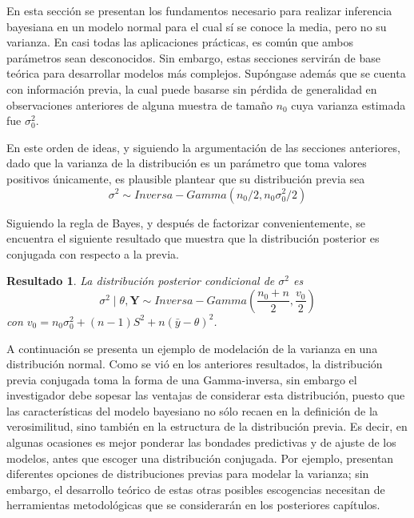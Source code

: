 \documentclass[
  10pt,
  spanish,
]{book}
\newtheorem{proposition}{Resultado}[chapter]
\theoremstyle{definition}
\theoremstyle{definition}
\theoremstyle{definition}
\theoremstyle{definition}
\theoremstyle{remark}
\begin{document}
En esta sección se presentan los fundamentos necesario para realizar inferencia bayesiana en un modelo normal para el cual sí se conoce la media, pero no su varianza. En casi todas las aplicaciones prácticas, es común que ambos parámetros sean desconocidos. Sin embargo, estas secciones servirán de base teórica para desarrollar modelos más complejos. Supóngase además que se cuenta con información previa, la cual puede basarse sin pérdida de generalidad en observaciones anteriores de alguna muestra de tamaño \(n_0\) cuya varianza estimada fue \(\sigma^2_0\).

En este orden de ideas, y siguiendo la argumentación de las secciones anteriores, dado que la varianza de la distribución es un parámetro que toma valores positivos únicamente, es plausible plantear que su distribución previa sea
\begin{equation*}
\sigma^2 \sim Inversa-Gamma(n_0/2, n_0\sigma^2_0/2)
\end{equation*}

Siguiendo la regla de Bayes, y después de factorizar convenientemente, se encuentra el siguiente resultado que muestra que la distribución posterior es conjugada con respecto a la previa.

\begin{proposition}
\protect\hypertarget{prp:unnamed-chunk-77}{}{\label{prp:unnamed-chunk-77} }La distribución posterior condicional de \(\sigma^2\) es
\begin{equation}
\sigma^2  \mid  \theta, \mathbf{Y} \sim Inversa-Gamma\left(\dfrac{n_0+n}{2},\dfrac{v_0}{2}\right)
\end{equation}
con \(v_0=n_0\sigma^2_0+(n-1)S^2+n(\bar{y}-\theta)^2\).
\end{proposition}

A continuación se presenta un ejemplo de modelación de la varianza en una distribución normal. Como se vió en los anteriores resultados, la distribución previa conjugada toma la forma de una Gamma-inversa, sin embargo el investigador debe sopesar las ventajas de considerar esta distribución, puesto que las características del modelo bayesiano no sólo recaen en la definición de la verosimilitud, sino también en la estructura de la distribución previa. Es decir, en algunas ocasiones es mejor ponderar las bondades predictivas y de ajuste de los modelos, antes que escoger una distribución conjugada. Por ejemplo, \citet{GelmanVariance2006} presentan diferentes opciones de distribuciones previas para modelar la varianza; sin embargo, el desarrollo teórico de estas otras posibles escogencias necesitan de herramientas metodológicas que se considerarán en los posteriores capítulos.
\end{document}
